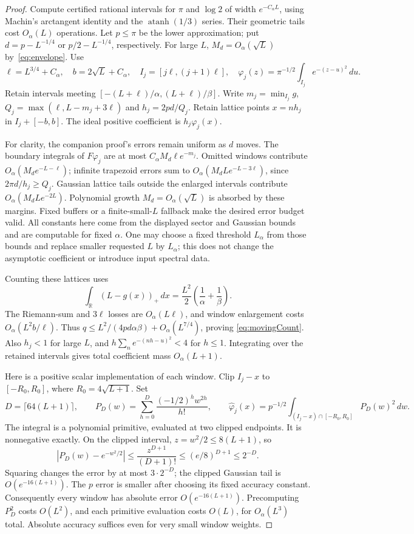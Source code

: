 \documentclass[11pt]{article}
\numberwithin{equation}{section}
\newcommand{\R}{\mathbb R}
\begin{document}
\begin{proof}
Compute certified rational intervals for $\pi$ and $\log2$ of width
$e^{-C_\alpha L}$, using Machin's arctangent identity and the
$\operatorname{atanh}(1/3)$ series. Their geometric tails cost
$O_\alpha(L)$ operations. Let $p\le\pi$ be the lower approximation;
put $d=p-L^{-1/4}$ or $p/2-L^{-1/4}$, respectively. For large $L$,
$M_d=O_\alpha(\sqrt L)$ by~\eqref{eq:envelope}. Use
\[
 \ell=L^{3/4}+C_\alpha,\quad b=2\sqrt L+C_\alpha,\quad
 I_j=[j\ell,(j+1)\ell],\quad
 \varphi_j(z)=\pi^{-1/2}\int_{I_j}e^{-(z-u)^2}\,du.
\]
Retain intervals meeting
$[-(L+\ell)/\alpha,(L+\ell)/\beta]$. Write
$m_j=\min_{I_j}g$, $Q_j=\max(\ell,L-m_j+3\ell)$ and
$h_j=2pd/Q_j$. Retain lattice points $x=nh_j$ in $I_j+[-b,b]$.
The ideal positive coefficient is $h_j\varphi_j(x)$.

For clarity, the companion proof's errors remain uniform as $d$ moves.
The boundary integrals of $F\varphi_j$ are at most
$C_\alpha M_d\ell e^{-m_j}$. Omitted windows contribute
$O_\alpha(M_de^{-L-\ell})$; infinite trapezoid errors sum to
$O_\alpha(M_dL e^{-L-3\ell})$, since $2\pi d/h_j\ge Q_j$.
Gaussian lattice tails outside the enlarged intervals contribute
$O_\alpha(M_dL e^{-2L})$. Polynomial growth $M_d=O_\alpha(\sqrt L)$
is absorbed by these margins. Fixed buffers or a finite-small-$L$
fallback make the desired error budget valid. All constants here come
from the displayed sector and Gaussian bounds and are computable for
fixed $\alpha$. One may choose a fixed threshold $L_\alpha$ from those
bounds and replace smaller requested $L$ by $L_\alpha$; this does not
change the asymptotic coefficient or introduce input spectral data.

Counting these lattices uses
\[
 \int_\R(L-g(x))_+\,dx
       =\frac{L^2}{2}\left(\frac1\alpha+\frac1\beta\right).
\]
The Riemann-sum and $3\ell$ losses are $O_\alpha(L\ell)$, and window
enlargement costs $O_\alpha(L^2b/\ell)$. Thus
$q\le L^2/(4pd\alpha\beta)+O_\alpha(L^{7/4})$, proving
\eqref{eq:movingCount}. Also $h_j<1$ for large $L$, and
$h\sum_n e^{-(nh-u)^2}<4$ for $h\le1$. Integrating over the retained
intervals gives total coefficient mass $O_\alpha(L+1)$.

Here is a positive scalar implementation of each window. Clip
$I_j-x$ to $[-R_0,R_0]$, where $R_0=4\sqrt{L+1}$. Set
\[
 D=\lceil64(L+1)\rceil,\qquad
 P_D(w)=\sum_{h=0}^D\frac{(-1/2)^h w^{2h}}{h!},\qquad
 \widehat\varphi_j(x)=p^{-1/2}\int_{(I_j-x)\cap[-R_0,R_0]}P_D(w)^2\,dw.
\]
The integral is a polynomial primitive, evaluated at two clipped
endpoints. It is nonnegative exactly. On the clipped interval,
$z=w^2/2\le8(L+1)$, so
\[
 |P_D(w)-e^{-w^2/2}|\le\frac{z^{D+1}}{(D+1)!}
       \le(e/8)^{D+1}\le2^{-D}.
\]
Squaring changes the error by at most $3\cdot2^{-D}$; the clipped
Gaussian tail is $O(e^{-16(L+1)})$. The $p$ error is smaller after
choosing its fixed accuracy constant. Consequently every window has
absolute error $O(e^{-16(L+1)})$. Precomputing $P_D^2$ costs $O(L^2)$,
and each primitive evaluation costs $O(L)$, for $O_\alpha(L^3)$ total.
Absolute accuracy suffices even for very small window weights.


\end{proof}
\end{document}
